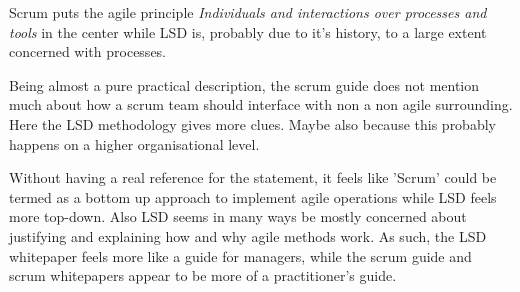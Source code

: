 \documentclass[a4paper,11pt,twoside]{article}
\begin{document}
Scrum puts the agile principle \textit{Individuals and interactions over processes and tools} in the center while LSD is, probably due to it's history, to a large extent concerned with processes.

Being almost a pure practical description, the scrum guide does not mention much about how a scrum team should interface with non a non agile surrounding. Here the LSD methodology gives more clues. Maybe also because this probably happens on a higher organisational level.

Without having a real reference for the statement, it feels like 'Scrum' could be termed as a bottom up approach to implement agile operations while LSD feels more top-down. Also LSD seems in many ways be mostly concerned about justifying and explaining how and why agile methods work. As such, the LSD whitepaper feels more like a guide for managers, while the scrum guide and scrum whitepapers appear to be more of a practitioner's guide. 
\end{document}
